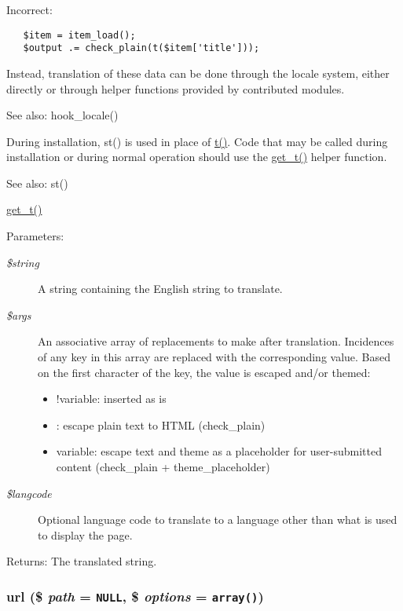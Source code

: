 Incorrect: 

\begin{Code}\begin{verbatim}   $item = item_load();
   $output .= check_plain(t($item['title']));
\end{verbatim}
\end{Code}



Instead, translation of these data can be done through the locale system, either directly or through helper functions provided by contributed modules. \begin{Desc}
\item[See also:]hook\_\-locale()\end{Desc}
During installation, st() is used in place of \hyperlink{common_8inc_41d20f0c822bf1f3c26a97981c762665}{t()}. Code that may be called during installation or during normal operation should use the \hyperlink{bootstrap_8inc_a50232f577883a48731fc93530628a79}{get\_\-t()} helper function. \begin{Desc}
\item[See also:]st() 

\hyperlink{bootstrap_8inc_a50232f577883a48731fc93530628a79}{get\_\-t()}\end{Desc}
\begin{Desc}
\item[Parameters:]
\begin{description}
\item[{\em \$string}]A string containing the English string to translate. \item[{\em \$args}]An associative array of replacements to make after translation. Incidences of any key in this array are replaced with the corresponding value. Based on the first character of the key, the value is escaped and/or themed:\begin{itemize}
\item !variable: inserted as is\item : escape plain text to HTML (check\_\-plain)\item variable: escape text and theme as a placeholder for user-submitted content (check\_\-plain + theme\_\-placeholder) \end{itemize}
\item[{\em \$langcode}]Optional language code to translate to a language other than what is used to display the page. \end{description}
\end{Desc}
\begin{Desc}
\item[Returns:]The translated string. \end{Desc}
\hypertarget{common_8inc_7ef60c766e2d09e18b866dacf6b9eb1f}{
\subsubsection[{url}]{\setlength{\rightskip}{0pt plus 5cm}url (\$ {\em path} = {\tt NULL}, \/  \$ {\em options} = {\tt array()})}}
\label{common_8inc_7ef60c766e2d09e18b866dacf6b9eb1f}


